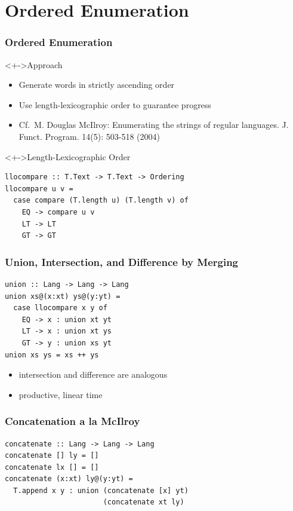 \documentclass[pdftex]{beamer}
\begin{document}
\section{Ordered Enumeration}
\begin{frame}[fragile]
  \frametitle{Ordered Enumeration}
  \vspace{-\baselineskip}
  \begin{block}<+->{Approach}
    \begin{itemize}
    \item Generate words in strictly ascending order
    \item Use length-lexicographic order to guarantee progress
    \item Cf.\ M. Douglas McIlroy:
      Enumerating the strings of regular languages. J. Funct. Program. 14(5): 503-518 (2004)
    \end{itemize}
  \end{block}
  \begin{block}<+->{Length-Lexicographic Order}
\begin{lstlisting}[numbers=none]
llocompare :: T.Text -> T.Text -> Ordering
llocompare u v =
  case compare (T.length u) (T.length v) of
    EQ -> compare u v
    LT -> LT
    GT -> GT
\end{lstlisting}
  \end{block}
\end{frame}
\begin{frame}
  \frametitle{Union, Intersection, and Difference by Merging}
\begin{lstlisting}[numbers=none]
union :: Lang -> Lang -> Lang
union xs@(x:xt) ys@(y:yt) =
  case llocompare x y of
    EQ -> x : union xt yt
    LT -> x : union xt ys
    GT -> y : union xs yt
union xs ys = xs ++ ys
\end{lstlisting}
  \begin{itemize}
  \item intersection and difference are analogous
  \item productive, linear time
  \end{itemize}
\end{frame}

\begin{frame}[fragile]
  \frametitle{Concatenation a la McIlroy}
\begin{lstlisting}[numbers=none]
concatenate :: Lang -> Lang -> Lang
concatenate [] ly = []
concatenate lx [] = []
concatenate (x:xt) ly@(y:yt) =
  T.append x y : union (concatenate [x] yt) 
                       (concatenate xt ly)
\end{lstlisting}
\end{frame}
\end{document}
